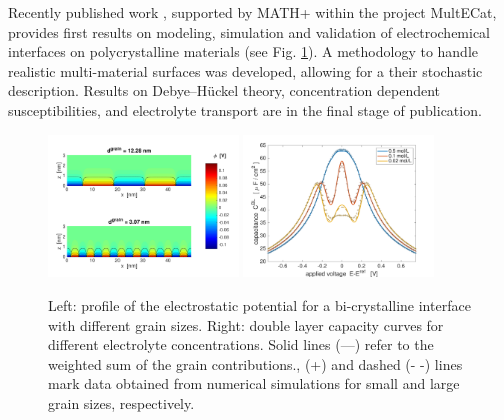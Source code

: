 \documentclass[a4paper,10pt]{article}
\begin{document}
Recently published work \cite{JES}, supported by MATH+ within the project MultECat, provides first results on modeling, simulation and validation of electrochemical interfaces on polycrystalline materials (see Fig. \ref{fig:JES}). A methodology to handle realistic multi-material surfaces was developed, allowing for a their stochastic description. Results on Debye--Hückel theory, concentration dependent susceptibilities, and electrolyte transport are in the final stage of publication. %

\begin{figure}
  \centering
  \includegraphics[width=0.45\textwidth]{phi_poly2d_gran.pdf}
  \includegraphics[width=0.45\textwidth]{c_2d_grain.pdf}
  \caption{Left: profile of the electrostatic potential for a bi-crystalline interface with different
    grain sizes.
    Right: double layer capacity curves for different electrolyte concentrations.
    Solid lines (—) refer to the weighted sum of the grain contributions.,
    (+) and dashed (- -) lines mark data obtained from numerical simulations for
    small and large grain sizes, respectively.
 \label{fig:JES}}
\end{figure}

\end{document}
